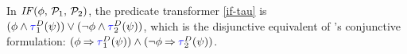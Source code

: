 In $\sIF{\aForm}\sTHEN\aPSS_1\sELSE\aPSS_2\sFI$, the predicate transformer
\eqref{if-tau} is
$(\aForm\land\aTr[1]{\bEvs}{\bForm})\lor(\neg\aForm\land\aTr[2]{\bEvs}{\bForm})$,
which is the disjunctive equivalent of \citeauthor{DBLP:journals/cacm/Dijkstra75}'s
conjunctive formulation: $(\aForm\limplies\aTr[1]{\bEvs}{\bForm})\land(\neg\aForm\limplies\aTr[2]{\bEvs}{\bForm})$.

